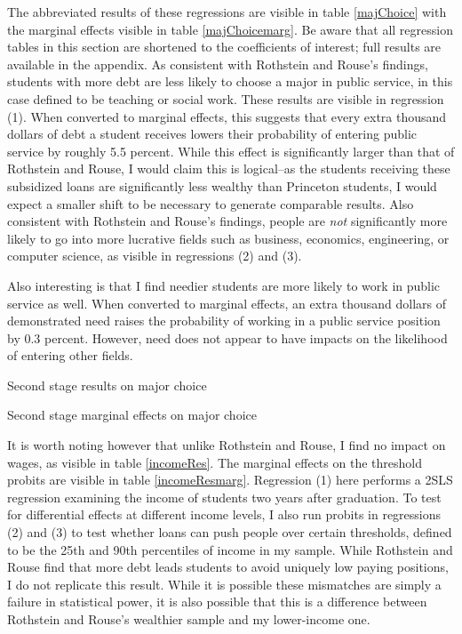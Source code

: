 \documentclass[12pt]{article}
\newcommand{\regs}{../Analysis/Regressions/Output/}
\begin{document}
	The abbreviated results of these regressions are visible in table \ref{majChoice} with the marginal effects visible in table \ref{majChoicemarg}. Be aware that all regression tables in this section are shortened to the coefficients of interest; full results are available in the appendix. As consistent with Rothstein and Rouse's findings, students with more debt are less likely to choose a major in public service, in this case defined to be teaching or social work. These results are visible in regression (1). When converted to marginal effects, this suggests that every extra thousand dollars of debt a student receives lowers their probability of entering public service by roughly 5.5 percent. While this effect is significantly larger than that of Rothstein and Rouse, I would claim this is logical--as the students receiving these subsidized loans are significantly less wealthy than Princeton students, I would expect a smaller shift to be necessary to generate comparable results. Also consistent with Rothstein and Rouse's findings, people are \emph{not} significantly more likely to go into more lucrative fields such as business, economics, engineering, or computer science, as visible in regressions (2) and (3). 
	
	Also interesting is that I find needier students are more likely to work in public service as well. When converted to marginal effects, an extra thousand dollars of demonstrated need raises the probability of working in a public service position by 0.3 percent. However, need does not appear to have impacts on the likelihood of entering other fields.

	\begin{table}
		\centering
		\caption{Second stage results on major choice}	
		\resizebox{\textwidth}{!}{	
			
		}
		\label{majChoice}
	\end{table}

	\begin{table}
		\centering
		\caption{Second stage marginal effects on major choice}	
		\resizebox{\textwidth}{!}{	
			
		}
		\label{majChoicemarg}
	\end{table}
	
	It is worth noting however that unlike Rothstein and Rouse, I find no impact on wages, as visible in table \ref{incomeRes}. The marginal effects on the threshold probits are visible in table \ref{incomeResmarg}. Regression (1) here performs a 2SLS regression examining the income of students two years after graduation. To test for differential effects at different income levels, I also run probits in regressions (2) and (3) to test whether loans can push people over certain thresholds, defined to be the 25th and 90th percentiles of income in my sample. While Rothstein and Rouse find that more debt leads students to avoid uniquely low paying positions, I do not replicate this result. While it is possible these mismatches are simply a failure in statistical power, it is also possible that this is a difference between Rothstein and Rouse's wealthier sample and my lower-income one. 
	
\end{document}
